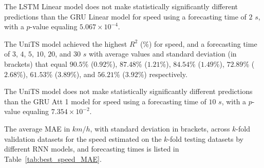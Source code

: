 The LSTM Linear model does not make statistically significantly different predictions than the GRU Linear model for speed using a forecasting time of $2$ $s$, with a $p$-value equaling $5.067 \times 10^{-4}$.

The UniTS model achieved the highest $R^{2}$ (\%) for speed, and a forecasting time of $3$, $4$, $5$, $10$, $20$, and $30$ $s$ with average values and standard deviation (in brackets) that equal $90.5$\% ($0.92$\%), $87.48$\% ($1.21$\%), $84.54$\% ($1.49$\%), $72.89$\% ($2.68$\%), $61.53$\% ($3.89$\%), and $56.21$\% ($3.92$\%) respectively.

The UniTS model does not make statistically significantly different predictions than the GRU Att 1 model for speed using a forecasting time of $10$ $s$, with a $p$-value equaling $7.354 \times 10^{-2}$.

The average MAE in $km/h$, with standard deviation in brackets, across $k$-fold validation datasets for the speed estimated on the $k$-fold testing datasets by different RNN models, and forecasting times is listed in Table~\ref{tab:best_speed_MAE}.

\begin{table}[!ht]
	\centering
	\caption{The average MAE in $km/h$, with standard deviation in brackets, across $k$-fold validation datasets for the speed estimated on the $k$-fold testing datasets by different RNN models, and forecasting times.}
	\label{tab:best_speed_MAE}
\end{table}

